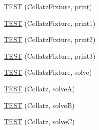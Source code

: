 \begin{DoxyCompactItemize}
\item 
\hyperlink{_test_collatz_8c_09_09_a1be21485425cf43808a497ed8ef4d418}{\-T\-E\-S\-T} (\-Collatz\-Fixture, print)
\item 
\hyperlink{_test_collatz_8c_09_09_a7ff0f20b9076fc1762bec9d580e29238}{\-T\-E\-S\-T} (\-Collatz\-Fixture, print1)
\item 
\hyperlink{_test_collatz_8c_09_09_a99f7dd94c98bff5b2e206c364d57e917}{\-T\-E\-S\-T} (\-Collatz\-Fixture, print2)
\item 
\hyperlink{_test_collatz_8c_09_09_a9715f206e9057726135c3e1d34f00f87}{\-T\-E\-S\-T} (\-Collatz\-Fixture, print3)
\item 
\hyperlink{_test_collatz_8c_09_09_a07f06cda216730b4038ffd06db5a3d1f}{\-T\-E\-S\-T} (\-Collatz\-Fixture, solve)
\item 
\hyperlink{_test_collatz_8c_09_09_a632670d9c17c9aa440740a8eb27b4d2f}{\-T\-E\-S\-T} (\-Collatz, solve\-A)
\item 
\hyperlink{_test_collatz_8c_09_09_afa2f80188332354d14df593c7a8e7e41}{\-T\-E\-S\-T} (\-Collatz, solve\-B)
\item 
\hyperlink{_test_collatz_8c_09_09_a30323a115f60e94d3ef917d6ad21e4d4}{\-T\-E\-S\-T} (\-Collatz, solve\-C)
\end{DoxyCompactItemize}



